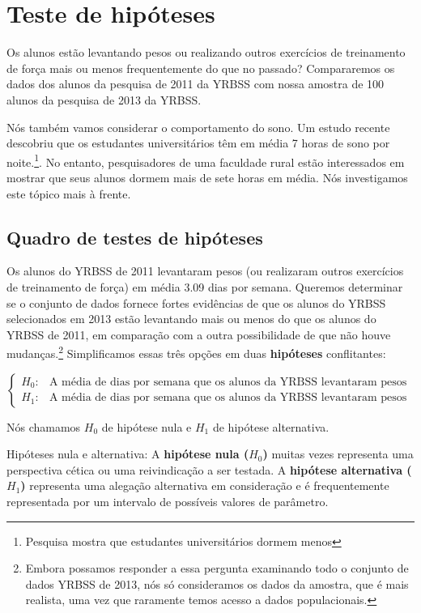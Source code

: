 \documentclass[
]{book}
\theoremstyle{definition}
\theoremstyle{definition}
\theoremstyle{definition}
\theoremstyle{definition}
\theoremstyle{remark}
\begin{document}
\hypertarget{hypothesisTest}{%
\section{Teste de hipóteses}\label{hypothesisTest}}

Os alunos estão levantando pesos ou realizando outros exercícios de treinamento de força mais ou menos frequentemente do que no passado? Compararemos os dados dos alunos da pesquisa de 2011 da YRBSS com nossa amostra de 100 alunos da pesquisa de 2013 da YRBSS.

Nós também vamos considerar o comportamento do sono. Um estudo recente descobriu que os estudantes universitários têm em média 7 horas de sono por noite.\footnote{Pesquisa mostra que estudantes universitários dormem menos}. No entanto, pesquisadores de uma faculdade rural estão interessados em mostrar que seus alunos dormem mais de sete horas em média. Nós investigamos este tópico mais à frente.

\hypertarget{hypothesisTestFramework}{%
\subsection{Quadro de testes de hipóteses}\label{hypothesisTestFramework}}

Os alunos do YRBSS de 2011 levantaram pesos (ou realizaram outros exercícios de treinamento de força) em média 3.09 dias por semana. Queremos determinar se o conjunto de dados fornece fortes evidências de que os alunos do YRBSS selecionados em 2013 estão levantando mais ou menos do que os alunos do YRBSS de 2011, em comparação com a outra possibilidade de que não houve mudanças.\footnote{Embora possamos responder a essa pergunta examinando todo o conjunto de dados YRBSS de 2013, nós só consideramos os dados da amostra, que é mais realista, uma vez que raramente temos acesso a dados populacionais.} Simplificamos essas três opções em duas \textbf{hipóteses} conflitantes:

\[
\begin{cases}
  H_0: & \mbox{A média de dias por semana que os alunos da YRBSS levantaram pesos foi a mesma para 2011 e 2013.} \\
  H_1: & \mbox{A média de dias por semana que os alunos da YRBSS levantaram pesos foi diferente para 2011 e 2013.}
\end{cases}
\]

Nós chamamos \(H_0\) de hipótese nula e \(H_1\) de hipótese alternativa.

Hipóteses nula e alternativa: A \textbf{hipótese nula (\(H_0\))} muitas vezes representa uma perspectiva cética ou uma reivindicação a ser testada. A \textbf{hipótese alternativa (\(H_1\))} representa uma alegação alternativa em consideração e é frequentemente representada por um intervalo de possíveis valores de parâmetro.
\end{document}
